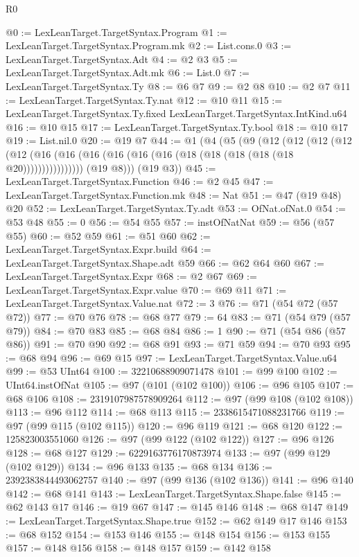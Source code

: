 \begin{lexlean}{R0}
\begin{coremodule}
@0 := LexLeanTarget.TargetSyntax.Program
@1 := LexLeanTarget.TargetSyntax.Program.mk
@2 := List.cons.{0}
@3 := LexLeanTarget.TargetSyntax.Adt
@4 := @2 @3
@5 := LexLeanTarget.TargetSyntax.Adt.mk
@6 := List.{0}
@7 := LexLeanTarget.TargetSyntax.Ty
@8 := @6 @7
@9 := @2 @8
@10 := @2 @7
@11 := LexLeanTarget.TargetSyntax.Ty.nat
@12 := @10 @11
@15 := LexLeanTarget.TargetSyntax.Ty.fixed LexLeanTarget.TargetSyntax.IntKind.u64
@16 := @10 @15
@17 := LexLeanTarget.TargetSyntax.Ty.bool
@18 := @10 @17
@19 := List.nil.{0}
@20 := @19 @7
@44 := @1
    (@4
      (@5
        (@9
          (@12
            (@12
              (@12
                (@12 (@12 (@16 (@16 (@16 (@16 (@16 (@16 (@18 (@18 (@18 (@18 (@18 @20))))))))))))))))
          (@19 @8)))
      (@19 @3))
@45 := LexLeanTarget.TargetSyntax.Function
@46 := @2 @45
@47 := LexLeanTarget.TargetSyntax.Function.mk
@48 := Nat
@51 := @47 (@19 @48) @20
@52 := LexLeanTarget.TargetSyntax.Ty.adt
@53 := OfNat.ofNat.{0}
@54 := @53 @48
@55 := 0
@56 := @54 @55
@57 := instOfNatNat
@59 := @56 (@57 @55)
@60 := @52 @59
@61 := @51 @60
@62 := LexLeanTarget.TargetSyntax.Expr.build
@64 := LexLeanTarget.TargetSyntax.Shape.adt @59
@66 := @62 @64 @60
@67 := LexLeanTarget.TargetSyntax.Expr
@68 := @2 @67
@69 := LexLeanTarget.TargetSyntax.Expr.value
@70 := @69 @11
@71 := LexLeanTarget.TargetSyntax.Value.nat
@72 := 3
@76 := @71 (@54 @72 (@57 @72))
@77 := @70 @76
@78 := @68 @77
@79 := 64
@83 := @71 (@54 @79 (@57 @79))
@84 := @70 @83
@85 := @68 @84
@86 := 1
@90 := @71 (@54 @86 (@57 @86))
@91 := @70 @90
@92 := @68 @91
@93 := @71 @59
@94 := @70 @93
@95 := @68 @94
@96 := @69 @15
@97 := LexLeanTarget.TargetSyntax.Value.u64
@99 := @53 UInt64
@100 := 32210688909071478
@101 := @99 @100
@102 := UInt64.instOfNat
@105 := @97 (@101 (@102 @100))
@106 := @96 @105
@107 := @68 @106
@108 := 2319107987578909264
@112 := @97 (@99 @108 (@102 @108))
@113 := @96 @112
@114 := @68 @113
@115 := 2338615471088231766
@119 := @97 (@99 @115 (@102 @115))
@120 := @96 @119
@121 := @68 @120
@122 := 125823003551060
@126 := @97 (@99 @122 (@102 @122))
@127 := @96 @126
@128 := @68 @127
@129 := 6229163776170873974
@133 := @97 (@99 @129 (@102 @129))
@134 := @96 @133
@135 := @68 @134
@136 := 2392383844493062757
@140 := @97 (@99 @136 (@102 @136))
@141 := @96 @140
@142 := @68 @141
@143 := LexLeanTarget.TargetSyntax.Shape.false
@145 := @62 @143 @17
@146 := @19 @67
@147 := @145 @146
@148 := @68 @147
@149 := LexLeanTarget.TargetSyntax.Shape.true
@152 := @62 @149 @17 @146
@153 := @68 @152
@154 := @153 @146
@155 := @148 @154
@156 := @153 @155
@157 := @148 @156
@158 := @148 @157
@159 := @142 @158

\end{coremodule}
\end{lexlean}
